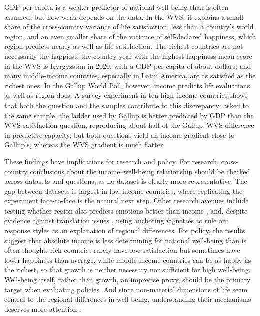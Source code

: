 \documentclass[12pt]{article}
\begin{document}
GDP per capita is a weaker predictor of national well-being than is often assumed, but how weak depends on the data. In the WVS, it explains a small share of the cross-country variance of life satisfaction, less than a country's world region, and an even smaller share of the variance of self-declared happiness, which region predicts nearly as well as life satisfaction.
The richest countries are not necessarily the happiest: the country-year with the highest happiness mean score in the WVS is Kyrgyzstan in 2020, %
with a GDP per capita of about \gdpKGZ dollars; and many middle-income countries, especially in Latin America, are as satisfied as the richest ones. In the Gallup World Poll, however, income predicts life evaluations as well as region does. A survey experiment in ten high-income countries shows that both the question and the samples contribute to this discrepancy: asked to the same sample, the ladder used by Gallup is better predicted by GDP than the WVS satisfaction question, reproducing about half of the Gallup--WVS difference in predictive capacity, but both questions yield an income gradient close to Gallup's, whereas the WVS gradient is much flatter.

These findings have implications for research and policy. For research, cross-country conclusions about the income--well-being relationship should be checked across datasets and questions, as no dataset is clearly more representative. The gap between datasets is largest in low-income countries, where replicating the experiment face-to-face is the natural next step. Other research avenues include testing whether region also predicts emotions better than income \citep{blanchflower_wellbeing_2024,killingsworth_income_2023}, and, despite evidence against translation issues \citep{diener_culture_2000}, using anchoring vignettes to rule out response styles as an explanation of regional differences. For policy, the results suggest that absolute income is less determining for national well-being than is often thought: rich countries rarely have low satisfaction but sometimes have lower happiness than average, while middle-income countries can be as happy as the richest, so that growth is neither necessary nor sufficient for high well-being. Well-being itself, rather than growth, an imprecise proxy, should be the primary target when evaluating policies. And since non-material dimensions of life seem central to the regional differences in well-being, understanding their mechanisms deserves more attention \citep{stiglitz_report_2009,frijters_happy_2020}.
\end{document}
